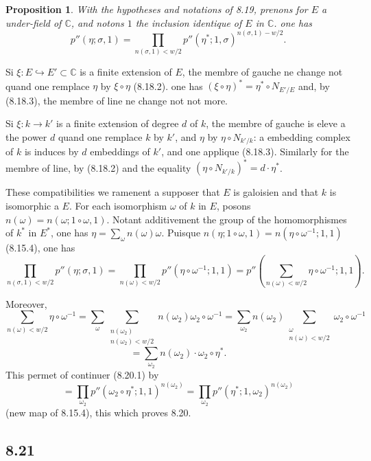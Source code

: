 \documentclass[12pt,a4paper]{article}
\theoremstyle{plain}
\newtheorem{proposition}[theorem]{Proposition}
\theoremstyle{definition}
\theoremstyle{remark}
\newcommand{\C}{\mathbb{C}}
\begin{document}
\begin{proposition}\label{prop:8.20}
With the hypotheses and notations of 8.19, prenons for $E$ a under-field of $\C$,
and notons $1$ the inclusion identique of $E$ in $\C$. one has
\[
p''(\eta; \sigma, 1) = \prod_{n(\sigma,1) < w/2} p''(\eta^*; 1, \sigma)^{n(\sigma,1) - w/2}.
\]
\end{proposition}

Si $\xi: E \hookrightarrow E' \subset \C$ is a finite extension of $E$, the membre of gauche ne
change not quand one remplace $\eta$ by $\xi \circ \eta$ (8.18.2). one has $(\xi \circ \eta)^* = \eta^* \circ
N_{E'/E}$ and, by (8.18.3), the membre of line ne change not not more.

Si $\xi: k \to k'$ is a finite extension of degree $d$ of $k$, the membre of gauche is
eleve a the power $d$ quand one remplace $k$ by $k'$, and $\eta$ by $\eta \circ N_{k'/k}$: a
embedding complex of $k$ is induces by $d$ embeddings of $k'$, and one applique
(8.18.3). Similarly for the membre of line, by (8.18.2) and the equality
$(\eta \circ N_{k'/k})^* = d \cdot \eta^*$.

These compatibilities we ramenent a supposer that $E$ is galoisien and that $k$ is
isomorphic a $E$. For each isomorphism $\omega$ of $k$ in $E$, posons
$n(\omega) = n(\omega; 1 \circ \omega, 1)$. Notant additivement the group of the homomorphismes
of $k^*$ in $E^*$, one has $\eta = \sum_\omega n(\omega) \omega$. Puisque
$n(\eta; 1 \circ \omega, 1) = n(\eta \circ \omega^{-1}; 1, 1)$ (8.15.4), one has
\begin{equation}\label{eq:8.20.1}
\prod_{n(\sigma,1) < w/2} p''(\eta; \sigma, 1) = \prod_{n(\omega) < w/2} p''(\eta \circ \omega^{-1}; 1, 1)
= p''\left(\sum_{n(\omega) < w/2} \eta \circ \omega^{-1}; 1, 1\right).
\end{equation}

Moreover,
\[
\sum_{n(\omega) < w/2} \eta \circ \omega^{-1} = \sum_{\omega} \sum_{\substack{n(\omega_2) \\ n(\omega_2) < w/2}} n(\omega_2) \omega_2 \circ \omega^{-1}
= \sum_{\omega_2} n(\omega_2) \sum_{\substack{\omega \\ n(\omega) < w/2}} \omega_2 \circ \omega^{-1}
\]
\[
= \sum_{\omega_2} n(\omega_2) \cdot \omega_2 \circ \eta^*.
\]
This permet of continuer (8.20.1) by
\[
= \prod_{\omega_2} p''(\omega_2 \circ \eta^*; 1, 1)^{n(\omega_2)} = \prod_{\omega_2} p''(\eta^*; 1, \omega_2)^{n(\omega_2)}
\]
(new map of 8.15.4), this which proves 8.20.

\subsection*{8.21}
\end{document}
